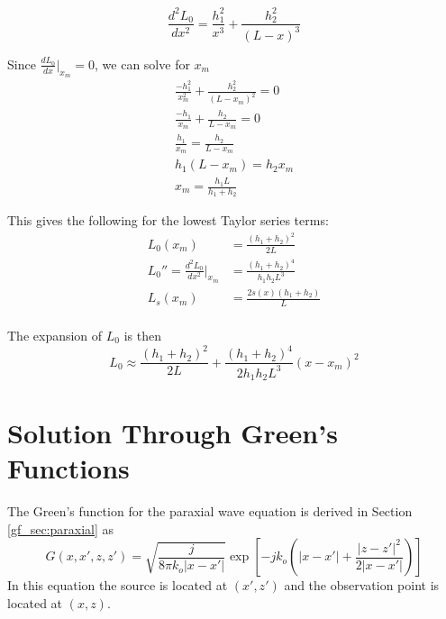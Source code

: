 \begin{equation}
\frac{d^2L_0}{dx^2} = \frac{h_1^2}{x^3} + \frac{h_2^2}{(L-x)^3} 
\label{mp_eq:16}
\end{equation}

\noindent Since $\frac{dL_0}{dx}\big|_{x_m} = 0$, we can solve for $x_m$
\begin{equation}
\begin{gathered}
\frac{-h_1^2}{x_m^2} + \frac{h_2^2}{(L-x_m)^2} = 0\\
\frac{-h_1}{x_m} + \frac{h_2}{L-x_m} = 0\\
\frac{h_1}{x_m} = \frac{h_2}{L-x_m}\\
h_1(L-x_m) = h_2x_m\\
x_m = \frac{h_1L}{h_1+h_2}
\end{gathered}
\label{mp_eq:17}
\end{equation}

\noindent This gives the following for the lowest Taylor series terms:
\begin{equation}
\begin{aligned}
L_0(x_m) &= \frac{(h_1+h_2)^2}{2L} \\
L_0''=\frac{d^2L_0}{dx^2}\bigg|_{x_m}  &= \frac{(h_1+h_2)^4}{h_1h_2L^3} \\
L_s(x_m) &= \frac{2s(x)(h_1 + h_2)}{L}\\
\end{aligned}
\label{mp_eq:17a}
\end{equation}

\noindent The expansion of $L_0$ is then
\begin{equation}
L_0 \approx \frac{(h_1+h_2)^2}{2L} + \frac{(h_1+h_2)^4}{2h_1h_2L^3}(x-x_m)^2
\label{mp_eq:18}
\end{equation}

\section{Solution Through Green's Functions}
The Green's function for the paraxial wave equation is derived in Section \ref{gf_sec:paraxial} as
\begin{equation}
G\left(x,x',z,z' \right)= \sqrt{\frac{j}{8\pi k_o|x-x'|}}\exp\left[-jk_o\left(|x -x'| + \frac{|z-z'|^2}{2|x-x'|}\right) \right]
\label{mp_eq:11aa}
\end{equation}
\renewcommand{\baselinestretch}{2} \small\normalsize
In this equation the source is located at $(x',z')$ and the observation point is located at $(x,z)$.

